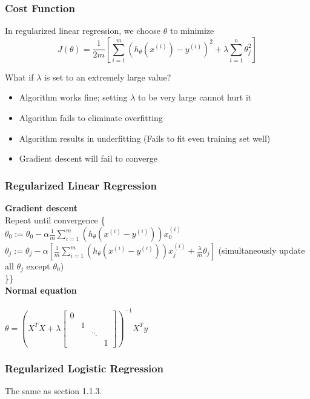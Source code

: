 \documentclass{article}
\newcommand\tab[1][1cm]{\hspace*{#1}}
\begin{document}
\subsubsection{Cost Function}
In regularized linear regression, we choose $\theta$ to minimize
$$J(\theta) = \frac{1}{2m}[ \sum_{i=1}^{m}(h_\theta(x^{(i)}) - y^{(i)})^2 + \lambda \sum_{i=1}^n \theta_{j}^2]$$

What if $\lambda$ is set to an extremely large value?
\begin{itemize}
  \item Algorithm works fine; setting $\lambda$ to be very large cannot hurt it
  \item Algorithm fails to eliminate overfitting
  \item Algorithm results in underfitting (Fails to fit even training set well)
  \item Gradient descent will fail to converge
\end{itemize}

\subsubsection{Regularized Linear Regression}
\textbf{Gradient descent}\\
Repeat until convergence \{\\
\tab $\theta_0 := \theta_0 - \alpha \frac{1}{m} \sum_{i=1}^{m}(h_\theta(x^{(i)} - y^{(i)})) x_{0}^{(i)}$ \\
\tab $\theta_j := \theta_j - \alpha [\frac{1}{m} \sum_{i=1}^{m}(h_\theta(x^{(i)} - y^{(i)})) x_{j}^{(i)} + \frac{\lambda}{m}\theta_j]$ (simultaneously update all $\theta_j$ except $\theta_0$) \\
\}\}\\

\textbf{Normal equation}\\\\
$\theta = (X^TX + \lambda \begin{bmatrix}
    0 & & & \\
    & 1 & & \\
    & & \ddots & \\
    & & & 1
  \end{bmatrix})^{-1} X^T y$

\subsubsection{Regularized Logistic Regression}
The same as section 1.1.3.
\end{document}
